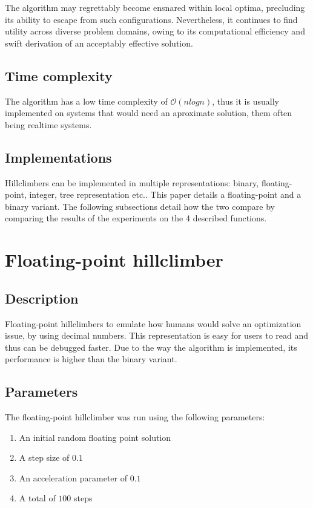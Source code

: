 \documentclass[conference]{IEEEtran}
\begin{document}
The algorithm may regrettably become ensnared within local optima, precluding its ability to escape from such configurations.
Nevertheless, it continues to find utility across diverse problem domains, owing to its computational efficiency and swift
derivation of an acceptably effective solution.

\subsection{Time complexity}
The algorithm has a low time complexity of $\mathcal{O}(n log n)$, thus it is usually implemented on systems that would need an
aproximate solution, them often being realtime systems.

\subsection{Implementations}
Hillclimbers can be implemented in multiple representations: binary, floating-point, integer, tree representation etc..
This paper details a floating-point and a binary variant. The following subsections detail how the two compare by comparing
the results of the experiments on the 4 described functions.


\section{Floating-point hillclimber}

\subsection{Description}
Floating-point hillclimbers to emulate how humans would solve an optimization issue, by using decimal numbers. This
representation is easy for users to read and thus can be debugged faster. Due to the way the algorithm is implemented, its
performance is higher than the binary variant.

\subsection{Parameters}
The floating-point hillclimber was run using the following parameters:

\begin{enumerate}
    \item An initial random floating point solution
    \item A step size of $0.1$
    \item An acceleration parameter of $0.1$
    \item A total of $100$ steps
\end{enumerate}
\end{document}
